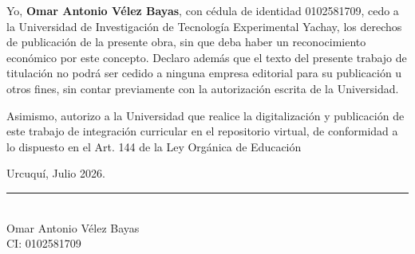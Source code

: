 Yo, \textbf{Omar Antonio Vélez Bayas}, con cédula de identidad 0102581709, cedo a la Universidad de Investigación de Tecnología Experimental Yachay, los derechos de publicación de la presente obra, sin que deba haber un reconocimiento económico por este concepto. Declaro además que el texto del presente trabajo de titulación no podrá ser cedido a ninguna empresa editorial para su publicación u otros fines, sin contar previamente con la autorización escrita de la Universidad.

\vspace{0.6cm}

\noindent Asimismo, autorizo a la Universidad que realice la digitalización y publicación de este trabajo de integración curricular en el repositorio virtual, de conformidad a lo dispuesto en el Art. 144 de la Ley Orgánica de Educación 

\vspace{0.6cm}

\noindent Urcuquí, Julio 2026.

\vspace{2.5cm}

\begin{center}
    \rule[0mm]{70mm}{0.1mm} \\
    {Omar Antonio Vélez Bayas}\\
    CI: 0102581709
\end{center}

\thispagestyle{empty} %
